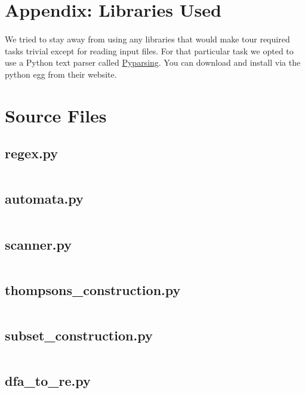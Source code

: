 \documentclass{article}
\begin{document}
\section{Appendix: Libraries Used}
\paragraph{} We tried to stay away from using any libraries that would make
tour required tasks trivial except for reading input files. For that
particular task we opted to use a Python text parser called
\href{http://pyparsing.wikispaces.com/}{Pyparsing}. You can download
and install via the python egg from their website.

\section{Source Files}
\label{code}
\subsection{regex.py}
\label{code:regex}
\inputminted{python}{./regex.py}

\subsection{automata.py}
\label{code:automata}
\inputminted{python}{./automata.py}

\subsection{scanner.py}
\label{code:scanner}
\inputminted{python}{./scanner.py}

\subsection{thompsons\_construction.py}
\label{code:thompsons}
\inputminted{python}{./thompsons_construction.py}

\subsection{subset\_construction.py}
\label{code:subset}
\inputminted{python}{./subset_construction.py}

\subsection{dfa\_to\_re.py}
\label{code:dfaToRe}
\inputminted{python}{./dfa_to_re.py}
\end{document}
